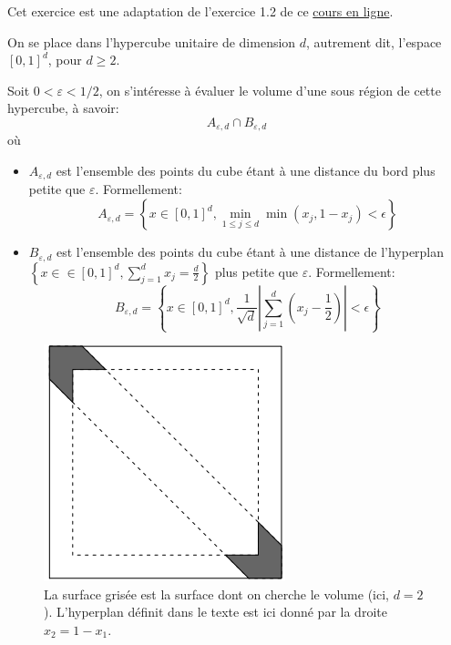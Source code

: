 \documentclass[]{article}
\providecommand{\tightlist}{%
  \setlength{\itemsep}{0pt}\setlength{\parskip}{0pt}}
\begin{document}
Cet exercice est une adaptation de l'exercice 1.2 de ce
\href{https://statweb.stanford.edu/~owen/mc/Ch-intro.pdf}{cours en
ligne}.

On se place dans l'hypercube unitaire de dimension \(d\), autrement dit,
l'espace \([0, 1]^d\), pour \(d \geq 2\).

Soit \(0 < \varepsilon < 1/2\), on s'intéresse à évaluer le volume d'une
sous région de cette hypercube, à savoir:
\[A_{\varepsilon, d}\cap B_{\varepsilon, d}\] où

\begin{itemize}
\tightlist
\item
  \(A_{\varepsilon, d}\) est l'ensemble des points du cube étant à une
  distance du bord plus petite que \(\varepsilon\). Formellement:
  \[A_{\varepsilon, d} = \left\lbrace x \in [0, 1]^d, \underset{1\leq j \leq d}{\min}\min (x_j, 1 - x_j) < \epsilon \right\rbrace\]
\item
  \(B_{\varepsilon, d}\) est l'ensemble des points du cube étant à une
  distance de l'hyperplan
  \(\left\lbrace x \in \in [0, 1]^d, \sum_{j = 1}^d x_j = \frac{d}{2} \right\rbrace\)
  plus petite que \(\varepsilon\). Formellement:
  \[B_{\varepsilon, d} = \left\lbrace x \in [0, 1]^d, \frac{1}{\sqrt{d}}\left\vert \sum_{j=1}^d (x_j - \frac{1}{2}) \right\vert < \epsilon \right\rbrace\]
\end{itemize}

\begin{figure}
\centering
\includegraphics{carre.png}
\caption{La surface grisée est la surface dont on cherche le volume
(ici, \(d = 2\)). L'hyperplan définit dans le texte est ici donné par la
droite \(x_2 = 1 - x_1\).}
\end{figure}
\end{document}
